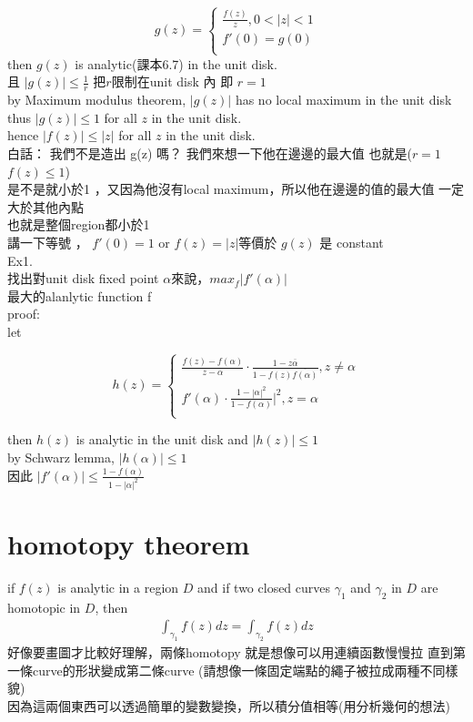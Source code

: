 \documentclass{article}
\begin{document}
$$g(z) =
\begin{cases}
     \frac{f(z)}{z}, 0<|z|<1\\
     f'(0) = g(0)\\
\end{cases}
$$
then $g(z)$ is analytic(課本6.7) in the unit disk.\\
且 $|g(z)| \leq \frac{1}{r}$ 把$r$限制在unit disk 內 即 $r = 1$\\
by Maximum modulus theorem, $|g(z)|$ has no local maximum in the unit disk
thus $|g(z)| \leq 1$ for all $z$ in the unit disk.\\
hence $|f(z)| \leq |z|$ for all $z$ in the unit disk.\\
白話： 我們不是造出 g(z) 嗎？ 我們來想一下他在邊邊的最大值 也就是($r=1$ $f(z) \leq 1$)\\
是不是就小於1 ，又因為他沒有local maximum，所以他在邊邊的值的最大值 一定大於其他內點\\
也就是整個region都小於1\\
講一下等號 ， $f'(0) = 1$ or $f(z) = |z|$等價於 $g(z)$ 是 constant\\

Ex1.\\
找出對unit disk fixed point $\alpha$來說，$max_f|f'(\alpha)|$\\
最大的alanlytic function f\\

proof:\\
let 

$$h(z) =
\begin{cases}
     \frac{f(z)-f(\alpha)}{z-\alpha} \cdot \frac{1-z\overline{\alpha}}{1-f(z)\overline{f(\alpha)}} , z \neq \alpha\\
     f'(\alpha) \cdot \frac{1-|\alpha|^2}{1-f(\alpha)}|^2 , z=\alpha\\
\end{cases}
$$

then $h(z)$ is analytic in the unit disk and $|h(z)| \leq 1$\\
by Schwarz lemma, $|h(\alpha)| \leq 1$\\
因此 $|f'(\alpha)| \leq \frac{1-f(\alpha)}{1-|\alpha|^2}$\\

\section{homotopy theorem}
if $f(z)$ is analytic in a region $D$ and if two closed curves $\gamma_1$ and $\gamma_2$ in $D$ are homotopic in $D$, then
\begin{align*}
    \int_{\gamma_1} f(z) dz = \int_{\gamma_2} f(z) dz 
\end{align*}
好像要畫圖才比較好理解，兩條homotopy 就是想像可以用連續函數慢慢拉
直到第一條curve的形狀變成第二條curve (請想像一條固定端點的繩子被拉成兩種不同樣貌)\\
因為這兩個東西可以透過簡單的變數變換，所以積分值相等(用分析幾何的想法)\\
\end{document}
